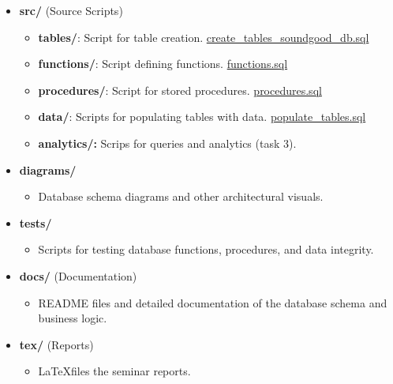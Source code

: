 \documentclass[a4paper]{scrartcl}
\begin{document}
\begin{itemize}
\item \textbf{src/} (Source Scripts)
\begin{itemize}
  \item \textbf{tables/}: Script for table creation.
  \href{https://github.com/VincentFerrigan/kth-iv1351-data-storage-paradigms/blob/main/src/tables/create_tables_soundgood_db.sql}{create\_tables\_soundgood\_db.sql}
  \item \textbf{functions/}: Script defining functions.
  \href{https://github.com/VincentFerrigan/kth-iv1351-data-storage-paradigms/blob/main/src/functions/functions.sql}{functions.sql}
  \item \textbf{procedures/}: Script for stored procedures.
  \href{https://github.com/VincentFerrigan/kth-iv1351-data-storage-paradigms/blob/main/src/procedures/procedures.sql}{procedures.sql}
  \item \textbf{data/}: Scripts for populating tables with data.
  \href{https://github.com/VincentFerrigan/kth-iv1351-data-storage-paradigms/blob/main/src/data/populate_tables.sql}{populate\_tables.sql}
  \item \textbf{analytics/:} Scrips for queries and analytics (task 3).
\end{itemize}

\item \textbf{diagrams/}
\begin{itemize}
  \item Database schema diagrams and other architectural visuals.
\end{itemize}

\item \textbf{tests/}
\begin{itemize}
  \item Scripts for testing database functions, procedures, and data integrity.
\end{itemize}

\item \textbf{docs/} (Documentation)
\begin{itemize}
  \item README files and detailed documentation of the database schema and business logic.
\end{itemize}

\item \textbf{tex/} (Reports)
\begin{itemize}
  \item \LaTeX files the seminar reports.
\end{itemize}


\end{itemize}
\end{document}
